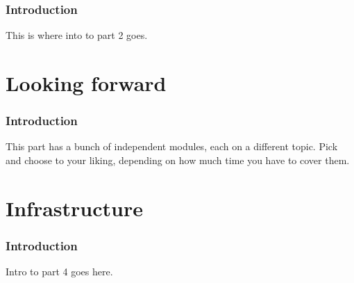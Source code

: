 \documentclass[]{article}
\begin{document}
\section{Introduction}\label{rigor-intro}

This is where into to part 2 goes.

\part{Looking forward}\label{part-looking-forward}

\section{Introduction}\label{forward-intro}

This part has a bunch of independent modules, each on a different topic.
Pick and choose to your liking, depending on how much time you have to
cover them.

\part{Infrastructure}\label{part-infrastructure}

\section{Introduction}\label{infra-intro}

Intro to part 4 goes here.
\end{document}
